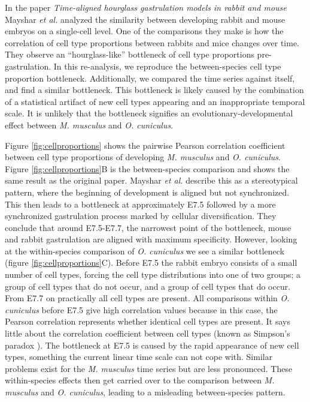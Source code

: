 In the paper \textit{Time-aligned hourglass gastrulation models in rabbit and mouse}\cite{Mayshar2023} Mayshar \textit{et al.} analyzed the similarity between developing rabbit and mouse embryos on a single-cell level. One of the comparisons they make is how the correlation of cell type proportions between rabbits and mice changes over time. They observe an ``hourglass-like'' bottleneck of cell type proportions pre-gastrulation. In this re-analysis, we reproduce the between-species cell type proportion bottleneck. Additionally, we compared the time series against itself, and find a similar bottleneck. This bottleneck is likely caused by the combination of a statistical artifact of new cell types appearing and an inappropriate temporal scale. It is unlikely that the bottleneck signifies an evolutionary-developmental effect between \textit{M. musculus} and \textit{O. cuniculus}.

Figure \ref{fig:cellproportions} shows the pairwise Pearson correlation coefficient between cell type proportions of developing \textit{M. musculus} and \textit{O. cuniculus}. Figure \ref{fig:cellproportions}B is the between-species comparison and shows the same result as the original paper. Mayshar \textit{et al.} describe this as a stereotypical pattern, where the beginning of development is aligned but not synchronized. This then leads to a bottleneck at approximately E7.5 followed by a more synchronized gastrulation process marked by cellular diversification. They conclude that around E7.5-E7.7, the narrowest point of the bottleneck, mouse and rabbit gastrulation are aligned with maximum specificity. However, looking at the within-species comparison of \textit{O. cuniculus} we see a similar bottleneck (figure \ref{fig:cellproportions}C). Before E7.5 the rabbit embryo consists of a small number of cell types, forcing the cell type distributions into one of two groups; a group of cell types that do not occur, and a group of cell types that do occur. From E7.7 on practically all cell types are present. All comparisons within \textit{O. cuniculus} before E7.5 give high correlation values because in this case, the Pearson correlation represents whether identical cell types are present. It says little about the correlation coefficient between cell types (known as Simpson's paradox \cite{Saccenti2023}). The bottleneck at E7.5 is caused by the rapid appearance of new cell types, something the current linear time scale can not cope with. Similar problems exist for the \textit{M. musculus} time series but are less pronounced. These within-species effects then get carried over to the comparison between \textit{M. musculus} and \textit{O. cuniculus}, leading to a misleading between-species pattern.

